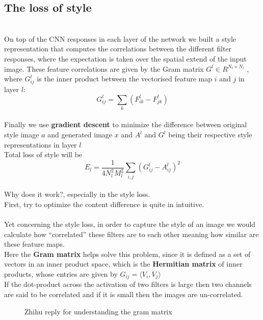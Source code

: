 \documentclass[11pt, a4paper]{article} %
\begin{document}
\subsection{The loss of style}
\\ On top of the CNN responses in each layer of the network we built a style representation
that computes the correlations between the different filter responses, where the expectation is
taken over the spatial extend of the input image. These feature correlations are given by the
Gram matrix $G^{l} \in R^{N_l \times N_l}$
, where $G^{l}_{ij}$ is the inner product between the vectorised feature map $i$ and $j$ in layer $l$:
\\ {\Large $$G^{l}_{ij} = \sum_{k}(F^{l}_{ik} - F^l_{jk})$$}
\\ Finally we use \textbf{gradient descent} to minimize the difference between original style image $a$ and generated image $x$ and $A^l$ and $G^l$ being their respective style representations in layer $l$
\\ Total loss of style will be
\\ {\Large $$E_{l} = \frac{1}{4N^{2}_{l}M^2_{l}} \sum_{i, j}(G^{l}_{ij} - A^l_{ij})^2$$}
\\ {\Large Why does it work?, especially in the style loss.}
\\ First, try to optimize the content difference is quite in intuitive.
\\
\\ Yet concerning the style loss, in order to capture the style of an image we would calculate how “correlated” these filters are to each other meaning how similar are these feature maps.
\\ Here the \textbf{Gram matrix} helps solve this problem, since it is defined as a set of vectors in an inner product space, which is the \textbf{Hermitian matrix} of inner products, whose entries are given by $G_{ij} = \langle V_{i}, V_{j}\rangle$
\\ If the dot-product across the activation of two filters is large then two channels are said to be correlated and if it is small then the images are un-correlated.
\\ 
\begin{figure}[H]
    \centering
    \caption{Zhihu reply for understanding the gram matrix}
\end{figure}
\end{document}
